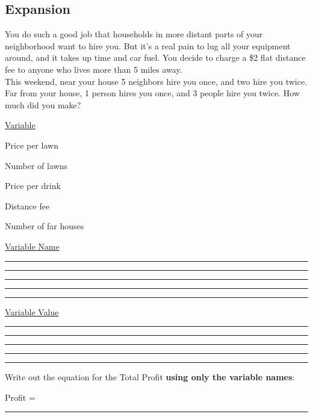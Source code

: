 \documentclass[paper=a4, fontsize=11pt]{scrartcl} %
\numberwithin{equation}{section} %
\numberwithin{figure}{section} %
\numberwithin{table}{section} %
\begin{document}
\pagebreak
\subsection{Expansion}



You do such a good job that households in more distant parts of your neighborhood want to hire you.  But it's a real pain to lug all your equipment around, and it takes up time and car fuel.  You decide to charge a \$2  flat distance fee to anyone who lives more than  5 miles away.\\  

This weekend, near your house 5 neighbors hire you once, and two hire you twice.  Far from your house, 1 person hires you once, and 3 people hire you twice.  How much did you make?

\begin{multicols}{3}

\begin{doublespacing}

\underline{Variable}

Price per lawn

Number of lawns

Price per drink

Distance fee

Number of far houses

\underline{Variable Name}

\rule{2.5cm}{0.15mm}

\rule{2.5cm}{0.15mm}

\rule{2.5cm}{0.15mm}

\rule{2.5cm}{0.15mm}

\rule{2.5cm}{0.15mm}

\underline{Variable Value}

\rule{2.5cm}{0.15mm}

\rule{2.5cm}{0.15mm}

\rule{2.5cm}{0.15mm}

\rule{2.5cm}{0.15mm}

\rule{2.5cm}{0.15mm}

\end{doublespacing}
\end{multicols}



\begin{doublespacing}
Write out the equation for the Total Profit \textbf{using only the variable names}: 

\vspace{0.5cm}

Profit =   \rule{10cm}{0.15mm}


\end{doublespacing}
\end{document}
